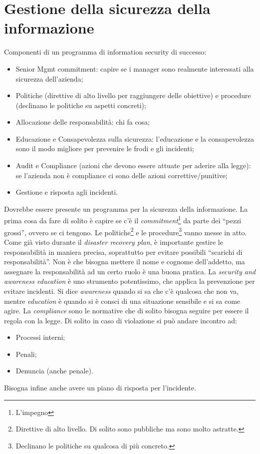 \section{Gestione della sicurezza della informazione}

Componenti di un programma di information security di successo:

\begin{itemize}
\item Senior Mgmt commitment: capire se i manager sono realmente interessati
alla sicurezza dell'azienda;
\item Politiche (direttive di alto livello per raggiungere delle obiettive) e
procedure (declinano le politiche su aspetti concreti);
\item Allocazione delle responsabilità: chi fa cosa;
\item Educazione e Consapevolezza sulla sicurezza: l'educazione e la
consapevolezza sono il modo migliore per prevenire le frodi e gli incidenti;
\item Audit e Compliance (azioni che devono essere attuate per aderire alla
legge): se l'azienda non è compliance ci sono delle azioni correttive/punitive;
\item Gestione e risposta agli incidenti.
\end{itemize}

Dovrebbe essere presente un programma per la sicurezza della informazione. La
prima cosa da fare di solito è capire se c'è il
\textit{commitment}\footnote{L'impegno} da parte dei ``pezzi grossi'', ovvero
se ci tengono. Le politiche\footnote{Direttive di alto livello. Di solito sono
pubbliche ma sono molto astratte.} e le procedure\footnote{Declinano le
politiche su qualcosa di più concreto.} vanno messe in atto. Come già visto
durante il \textit{disaster recovery plan}, è importante gestire le
responsabilità in maniera precisa, soprattutto per evitare possibili ``scarichi
di responsabilità''. Non è che bisogna mettere il nome e cognome dell'addetto,
ma assegnare la responsabilità ad un certo ruolo è una buona pratica. La
\textit{security and awareness education} è uno strumento potentissimo, che
applica la prevenzione per evitare incidenti. Si dice \textit{awareness} quando
si sa che c'è qualcosa che non va, mentre \textit{education} è quando si è
consci di una situazione sensibile e si sa come agire.
La \textit{compliance} sono le normative che di solito bisogna seguire per
essere il regola con la legge. Di solito in caso di violazione si può andare
incontro ad:
\begin{itemize}
  \item Processi interni;
  \item Penali;
  \item Denuncia (anche penale).
\end{itemize}
Bisogna infine anche avere un piano di risposta per l'incidente.


